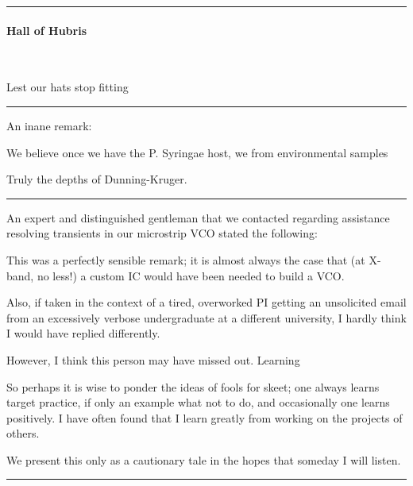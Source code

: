 \documentclass[fleqn,10pt]{article}
\begin{document}
\begin{multicols}{1}
\rule{\linewidth}{0.2pt}



\paragraph{Hall of Hubris} \

Lest our hats stop fitting

\rule{\linewidth}{0.2pt}

An inane remark:

\begin{displayquote}
We believe once we have the P. Syringae host, we from environmental samples
\end{displayquote}

Truly the depths of Dunning-Kruger.

\rule{\linewidth}{0.2pt}

An expert and distinguished gentleman that we contacted regarding assistance resolving transients in our microstrip VCO stated the following:



This was a perfectly sensible remark; it is almost always the case that (at X-band, no less!) a custom IC would have been needed to build a VCO.

Also, if taken in the context of a tired, overworked PI getting an unsolicited email from an excessively verbose undergraduate at a different university, I hardly think I would have replied differently.

However, I think this person may have missed out. Learning 

So perhaps it is wise to ponder the ideas of fools for skeet; one always learns target practice, if only an example what not to do, and occasionally one learns positively. I have often found that I learn greatly from working on the projects of others.

We present this only as a cautionary tale in the hopes that someday I will listen.

\rule{\linewidth}{0.2pt}

\end{multicols}

\end{document}
